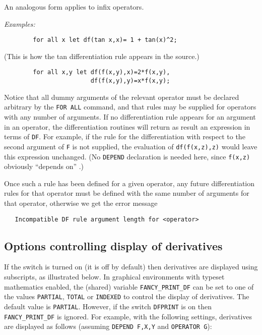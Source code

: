 An analogous form applies to infix operators.

\textit{Examples:}
\begin{verbatim}
        for all x let df(tan x,x)= 1 + tan(x)^2;
\end{verbatim}
(This is how the tan differentiation rule appears in the {\REDUCE}
source.)
\begin{verbatim}
        for all x,y let df(f(x,y),x)=2*f(x,y),
                        df(f(x,y),y)=x*f(x,y);
\end{verbatim}
Notice that all dummy arguments of the relevant operator must be declared
arbitrary by the \texttt{FOR ALL} command, and that rules may be supplied for
operators with any number of arguments.  If no differentiation rule
appears for an argument in an operator, the differentiation routines will
return as result an expression in terms of \texttt{DF}.  For
example, if the rule for the differentiation with respect to the second
argument of \texttt{F} is not supplied, the evaluation of \texttt{df(f(x,z),z)}
would leave this expression unchanged. (No \texttt{DEPEND} declaration
is needed here, since \texttt{f(x,z)} obviously ``depends on'' .)

Once such a rule has been defined for a given operator, any future
differentiation rules for that operator must be
defined with the same number of arguments for that operator, otherwise we
get the error message
\begin{verbatim}
   Incompatible DF rule argument length for <operator>
\end{verbatim}


\subsection{Options controlling display of derivatives}
\hypertarget{switch:DFPRINT}{}

If the switch  is turned on (it is
off by default) then derivatives are displayed using subscripts, as
illustrated below.  In graphical environments with typeset mathematics
enabled, the (shared) variable
\texttt{FANCY\_PRINT\_DF} can be set to one
of the values \texttt{PARTIAL},
\texttt{TOTAL} or \texttt{INDEXED} to
control the display of derivatives.  The default value is
\texttt{PARTIAL}.  However, if the switch \texttt{DFPRINT} is on then
\texttt{FANCY\_PRINT\_DF} is ignored.  For example, with the following
settings, derivatives are displayed as follows (assuming
\texttt{DEPEND F,X,Y} and \texttt{OPERATOR G}):

